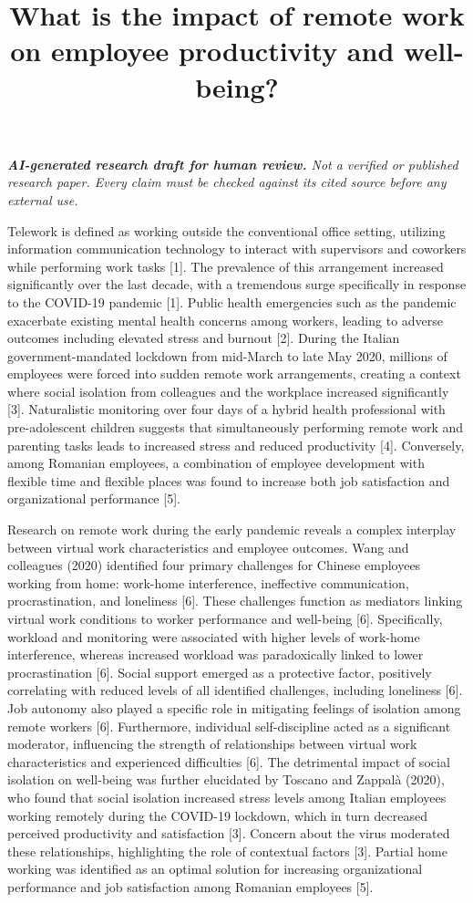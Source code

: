 \documentclass[11pt]{article}
\title{What is the impact of remote work on employee productivity and well-being?}
\date{}
\begin{document}
\maketitle
\textit{\textbf{AI-generated research draft for human review.} Not a verified or published research paper. Every claim must be checked against its cited source before any external use.}\par

Telework is defined as working outside the conventional office setting, utilizing information communication technology to interact with supervisors and coworkers while performing work tasks [1]. The prevalence of this arrangement increased significantly over the last decade, with a tremendous surge specifically in response to the COVID-19 pandemic [1]. Public health emergencies such as the pandemic exacerbate existing mental health concerns among workers, leading to adverse outcomes including elevated stress and burnout [2]. During the Italian government-mandated lockdown from mid-March to late May 2020, millions of employees were forced into sudden remote work arrangements, creating a context where social isolation from colleagues and the workplace increased significantly [3]. Naturalistic monitoring over four days of a hybrid health professional with pre-adolescent children suggests that simultaneously performing remote work and parenting tasks leads to increased stress and reduced productivity [4]. Conversely, among Romanian employees, a combination of employee development with flexible time and flexible places was found to increase both job satisfaction and organizational performance [5].

Research on remote work during the early pandemic reveals a complex interplay between virtual work characteristics and employee outcomes. Wang and colleagues (2020) identified four primary challenges for Chinese employees working from home: work-home interference, ineffective communication, procrastination, and loneliness [6]. These challenges function as mediators linking virtual work conditions to worker performance and well-being [6]. Specifically, workload and monitoring were associated with higher levels of work-home interference, whereas increased workload was paradoxically linked to lower procrastination [6]. Social support emerged as a protective factor, positively correlating with reduced levels of all identified challenges, including loneliness [6]. Job autonomy also played a specific role in mitigating feelings of isolation among remote workers [6]. Furthermore, individual self-discipline acted as a significant moderator, influencing the strength of relationships between virtual work characteristics and experienced difficulties [6]. The detrimental impact of social isolation on well-being was further elucidated by Toscano and Zappalà (2020), who found that social isolation increased stress levels among Italian employees working remotely during the COVID-19 lockdown, which in turn decreased perceived productivity and satisfaction [3]. Concern about the virus moderated these relationships, highlighting the role of contextual factors [3]. Partial home working was identified as an optimal solution for increasing organizational performance and job satisfaction among Romanian employees [5].
\end{document}
